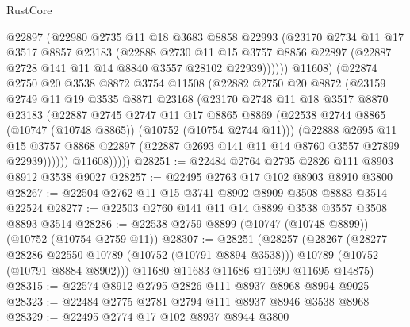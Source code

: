 \begin{lexlean}{RustCore}
\begin{coremodule}
                  @22897
                  (@22980
                    @2735
                    @11
                    @18
                    @3683
                    @8858
                    @22993
                    (@23170
                      @2734
                      @11
                      @17
                      @3517
                      @8857
                      @23183
                      (@22888
                        @2730
                        @11
                        @15
                        @3757
                        @8856
                        @22897
                        (@22887 @2728 @141 @11 @14 @8840 @3557 @28102 @22939))))))
              @11608)
            (@22874
              @2750
              @20
              @3538
              @8872
              @3754
              @11508
              (@22882
                @2750
                @20
                @8872
                (@23159
                  @2749
                  @11
                  @19
                  @3535
                  @8871
                  @23168
                  (@23170
                    @2748
                    @11
                    @18
                    @3517
                    @8870
                    @23183
                    (@22887
                      @2745
                      @2747
                      @11
                      @17
                      @8865
                      @8869
                      (@22538 @2744 @8865 (@10747 (@10748 @8865)) (@10752 (@10754 @2744 @11)))
                      (@22888
                        @2695
                        @11
                        @15
                        @3757
                        @8868
                        @22897
                        (@22887 @2693 @141 @11 @14 @8760 @3557 @27899 @22939))))))
              @11608)))))
@28251 := @22484 @2764 @2795 @2826 @111 @8903 @8912 @3538 @9027
@28257 := @22495 @2763 @17 @102 @8903 @8910 @3800
@28267 := @22504 @2762 @11 @15 @3741 @8902 @8909 @3508 @8883 @3514 @22524
@28277 := @22503 @2760 @141 @11 @14 @8899 @3538 @3557 @3508 @8893 @3514
@28286 := @22538 @2759 @8899 (@10747 (@10748 @8899)) (@10752 (@10754 @2759 @11))
@28307 := @28251
    (@28257
      (@28267
        (@28277 @28286 @22550 @10789 (@10752 (@10791 @8894 @3538)))
        @10789
        (@10752 (@10791 @8884 @8902)))
      @11680
      @11683
      @11686
      @11690
      @11695
      @14875)
@28315 := @22574 @8912 @2795 @2826 @111 @8937 @8968 @8994 @9025
@28323 := @22484 @2775 @2781 @2794 @111 @8937 @8946 @3538 @8968
@28329 := @22495 @2774 @17 @102 @8937 @8944 @3800

\end{coremodule}
\end{lexlean}
